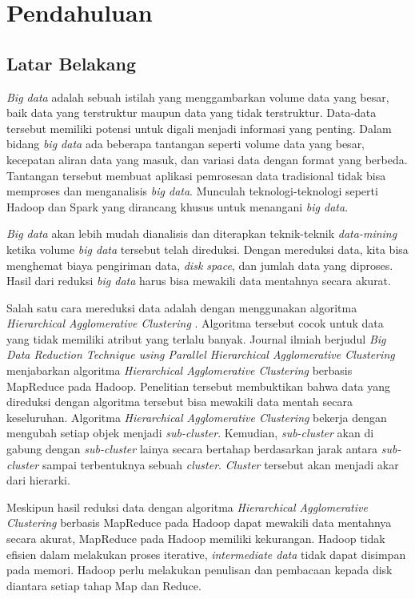 \chapter{Pendahuluan}
\label{chap:intro}
   
\section{Latar Belakang}
\label{sec:label}

{\it Big data} adalah sebuah istilah yang menggambarkan volume data yang besar, baik data yang terstruktur maupun data yang tidak terstruktur. Data-data tersebut memiliki potensi untuk digali menjadi informasi yang penting. Dalam bidang {\it big data} ada  beberapa tantangan seperti volume data yang besar, kecepatan aliran data yang masuk, dan variasi data dengan format yang berbeda. Tantangan tersebut membuat aplikasi pemrosesan data tradisional  tidak bisa memproses dan menganalisis {\it big data}. Munculah teknologi-teknologi seperti Hadoop dan Spark yang dirancang khusus untuk menangani {\it big data}. 

{\it Big data} akan lebih mudah dianalisis dan diterapkan teknik-teknik {\it data-mining} ketika volume {\it big data} tersebut telah direduksi. Dengan mereduksi data, kita bisa menghemat biaya pengiriman data, {\it disk space}, dan jumlah data yang diproses. Hasil dari reduksi {\it big data} harus bisa mewakili data mentahnya secara akurat. 

Salah satu cara mereduksi data adalah dengan menggunakan algoritma {\it Hierarchical Agglomerative Clustering }. Algoritma tersebut cocok untuk data yang tidak memiliki atribut yang terlalu banyak. Journal ilmiah berjudul {\it Big Data Reduction Technique using Parallel Hierarchical Agglomerative Clustering} menjabarkan algoritma {\it Hierarchical Agglomerative Clustering} berbasis MapReduce pada Hadoop. Penelitian tersebut membuktikan bahwa data yang direduksi dengan algoritma tersebut bisa mewakili data mentah secara keseluruhan. Algoritma {\it Hierarchical Agglomerative Clustering} bekerja dengan mengubah setiap objek menjadi {\it sub-cluster}. Kemudian, {\it sub-cluster} akan di gabung dengan {\it sub-cluster} lainya secara bertahap berdasarkan jarak antara {\it sub-cluster} sampai terbentuknya sebuah \textit{cluster}. {\it Cluster} tersebut akan menjadi akar dari hierarki.

Meskipun hasil reduksi data dengan algoritma {\it Hierarchical Agglomerative Clustering} berbasis MapReduce pada Hadoop dapat mewakili data mentahnya secara akurat, MapReduce pada Hadoop memiliki kekurangan. Hadoop tidak efisien dalam melakukan proses iterative, {\it intermediate data} tidak dapat disimpan pada memori. Hadoop perlu melakukan penulisan dan pembacaan kepada disk diantara setiap tahap Map dan Reduce.

